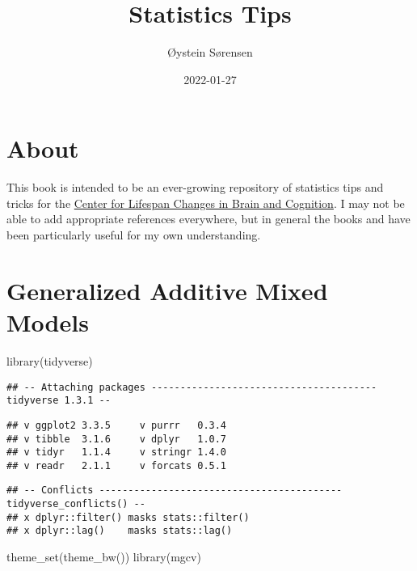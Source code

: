 \documentclass[
]{book}
\title{Statistics Tips}
\author{Øystein Sørensen}
\date{2022-01-27}
\newenvironment{Shaded}{\begin{snugshade}}{\end{snugshade}}
\newcommand{\FunctionTok}[1]{\textcolor[rgb]{0.00,0.00,0.00}{#1}}
\newcommand{\NormalTok}[1]{#1}
\begin{document}
\maketitle

{
\setcounter{tocdepth}{1}
\tableofcontents
}
\hypertarget{about}{%
\chapter{About}\label{about}}

This book is intended to be an ever-growing repository of statistics tips and tricks for the \href{https://www.oslobrains.no/}{Center for Lifespan Changes in Brain and Cognition}. I may not be able to add appropriate references everywhere, but in general the books \citet{wood2017a} and \citet{pinheiro2000} have been particularly useful for my own understanding.

\hypertarget{generalized-additive-mixed-models}{%
\chapter{Generalized Additive Mixed Models}\label{generalized-additive-mixed-models}}

\begin{Shaded}
\begin{Highlighting}[]
\FunctionTok{library}\NormalTok{(tidyverse)}
\end{Highlighting}
\end{Shaded}

\begin{verbatim}
## -- Attaching packages --------------------------------------- tidyverse 1.3.1 --
\end{verbatim}

\begin{verbatim}
## v ggplot2 3.3.5     v purrr   0.3.4
## v tibble  3.1.6     v dplyr   1.0.7
## v tidyr   1.1.4     v stringr 1.4.0
## v readr   2.1.1     v forcats 0.5.1
\end{verbatim}

\begin{verbatim}
## -- Conflicts ------------------------------------------ tidyverse_conflicts() --
## x dplyr::filter() masks stats::filter()
## x dplyr::lag()    masks stats::lag()
\end{verbatim}

\begin{Shaded}
\begin{Highlighting}[]
\FunctionTok{theme\_set}\NormalTok{(}\FunctionTok{theme\_bw}\NormalTok{())}
\FunctionTok{library}\NormalTok{(mgcv)}
\end{Highlighting}
\end{Shaded}
\end{document}
